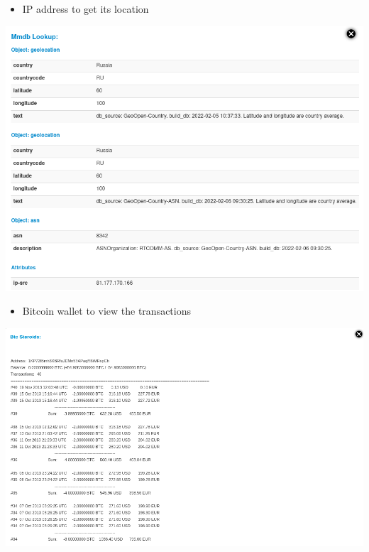 \begin{frame}
    \begin{itemize}
        \item IP address to get its location
    \end{itemize}
    \includegraphics[width=1.0\linewidth]{pictures/case2/enrichment1.png}
\end{frame}

\begin{frame}
    \begin{itemize}
        \item Bitcoin wallet to view the transactions
    \end{itemize}
    \includegraphics[width=1.0\linewidth]{pictures/case2/enrichment-btc.png}
\end{frame}

